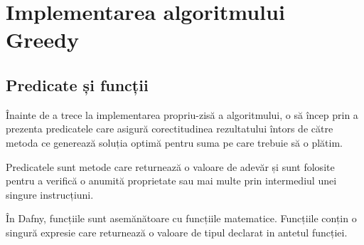 \section{Implementarea algoritmului Greedy}
\subsection{Predicate și funcții }
Înainte de a trece la implementarea propriu-zisă a algoritmului, o să încep prin a prezenta predicatele care asigură corectitudinea rezultatului întors de către metoda ce generează soluția optimă pentru suma pe care trebuie să o plătim. \par 
Predicatele sunt metode care returnează o valoare de adevăr și sunt folosite pentru a verifică o anumită proprietate sau mai multe prin intermediul unei singure instrucțiuni.
\par
În Dafny, funcțiile sunt asemănătoare cu funcțiile matematice. Funcțiile conțin o singură expresie care returnează o valoare de tipul declarat in antetul funcției.


